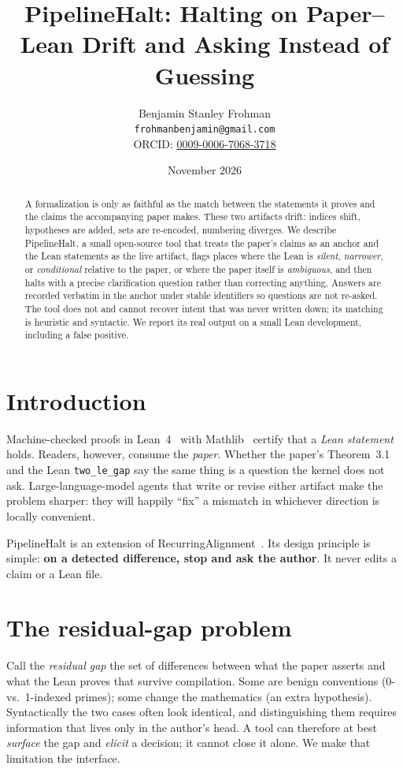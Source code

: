 \documentclass[11pt]{article}
\title{PipelineHalt: Halting on Paper--Lean Drift and Asking Instead of Guessing}
\author{Benjamin Stanley Frohman\\\texttt{frohmanbenjamin@gmail.com}\\ORCID: \href{https://orcid.org/0009-0006-7068-3718}{0009-0006-7068-3718}}
\date{November 2026}
\begin{document}
\maketitle
{}\par

\begin{abstract}
A formalization is only as faithful as the match between the statements it proves and the claims the accompanying paper makes. These two artifacts drift: indices shift, hypotheses are added, sets are re-encoded, numbering diverges. We describe PipelineHalt, a small open-source tool that treats the paper's claims as an anchor and the Lean statements as the live artifact, flags places where the Lean is \emph{silent}, \emph{narrower}, or \emph{conditional} relative to the paper, or where the paper itself is \emph{ambiguous}, and then halts with a precise clarification question rather than correcting anything. Answers are recorded verbatim in the anchor under stable identifiers so questions are not re-asked. The tool does not and cannot recover intent that was never written down; its matching is heuristic and syntactic. We report its real output on a small Lean development, including a false positive.
\end{abstract}

\section{Introduction}
Machine-checked proofs in Lean~4~\cite{moura2021lean4} with Mathlib~\cite{mathlib2020} certify that a \emph{Lean statement} holds. Readers, however, consume the \emph{paper}. Whether the paper's Theorem~3.1 and the Lean \texttt{two\_le\_gap} say the same thing is a question the kernel does not ask. Large-language-model agents that write or revise either artifact make the problem sharper: they will happily ``fix'' a mismatch in whichever direction is locally convenient.

PipelineHalt is an extension of RecurringAlignment~\cite{frohman2026ra}. Its design principle is simple: \textbf{on a detected difference, stop and ask the author}. It never edits a claim or a Lean file.

\section{The residual-gap problem}
Call the \emph{residual gap} the set of differences between what the paper asserts and what the Lean proves that survive compilation. Some are benign conventions (0- vs.\ 1-indexed primes); some change the mathematics (an extra hypothesis). Syntactically the two cases often look identical, and distinguishing them requires information that lives only in the author's head. A tool can therefore at best \emph{surface} the gap and \emph{elicit} a decision; it cannot close it alone. We make that limitation the interface.
\end{document}
